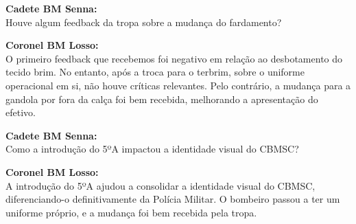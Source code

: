 \noindent \textbf{Cadete BM Senna:} \\ Houve algum feedback da tropa sobre a mudança do fardamento?

\noindent \textbf{Coronel BM Losso:} \\ O primeiro feedback que recebemos foi negativo em relação ao desbotamento do tecido brim. No entanto, após a troca para o terbrim, sobre o uniforme operacional em si, não houve críticas relevantes. Pelo contrário, a mudança para a gandola por fora da calça foi bem recebida, melhorando a apresentação do efetivo.

\noindent \textbf{Cadete BM Senna:} \\ Como a introdução do 5ºA impactou a identidade visual do CBMSC?

\noindent \textbf{Coronel BM Losso:} \\ A introdução do 5ºA ajudou a consolidar a identidade visual do CBMSC, diferenciando-o definitivamente da Polícia Militar. O bombeiro passou a ter um uniforme próprio, e a mudança foi bem recebida pela tropa.


